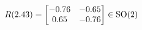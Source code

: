 \documentclass[preview]{standalone}
\begin{document}
\begin{align*}
\special{dvisvgm:raw <g id='unique000'>}R(2.43) = \begin{bmatrix} -0.76 & -0.65 \\ 0.65 & -0.76 \end{bmatrix} \in \text{SO}(2)\special{dvisvgm:raw </g>}
\end{align*}
\end{document}
